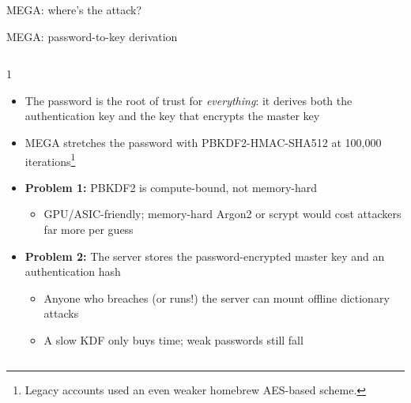 \ifdefined\PRESENTATION\else\PassOptionsToClass{handout}{beamer}\fi\documentclass[aspectratio=169, lualatex]{beamer}
\begin{document}
\begin{frame}{MEGA: where's the attack?}
\end{frame}

\begin{frame}{MEGA: password-to-key derivation}
	\begin{columns}[c]
		\begin{column}{1\textwidth}
			\begin{itemize}
				\item The password is the root of trust for \textit{everything}: it derives both the authentication key and the key that encrypts the master key
				\item MEGA stretches the password with PBKDF2-HMAC-SHA512 at 100,000 iterations\footnote{Legacy accounts used an even weaker homebrew AES-based scheme.}
				\item \textbf{Problem 1:} PBKDF2 is compute-bound, not memory-hard
				      \begin{itemize}
					      \item GPU/ASIC-friendly; memory-hard Argon2 or scrypt would cost attackers far more per guess
				      \end{itemize}
				\item \textbf{Problem 2:} The server stores the password-encrypted master key and an authentication hash
				      \begin{itemize}
					      \item Anyone who breaches (or runs!) the server can mount offline dictionary attacks
					      \item A slow KDF only buys time; weak passwords still fall
				      \end{itemize}
			\end{itemize}
		\end{column}
	\end{columns}
\end{frame}
\end{document}
